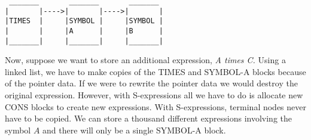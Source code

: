 \begin{verbatim}
 _______       _______       _______
|       |---->|       |---->|       |
|TIMES  |     |SYMBOL |     |SYMBOL |
|       |     |A      |     |B      |
|_______|     |_______|     |_______|
\end{verbatim}

\medskip
\noindent
Now, suppose we want to store an additional expression, {\it A times C.}
Using a linked list, we have to make copies of the TIMES and SYMBOL-A blocks
because of the pointer data.
If we were to rewrite the pointer data we would destroy the original
expression.
However, with S-expressions all we have to do is allocate new CONS
blocks to create new expressions.
With S-expressions, terminal nodes never have to be copied.
We can store a thousand different expressions involving the symbol $A$ and there
will only be a single SYMBOL-A block.

